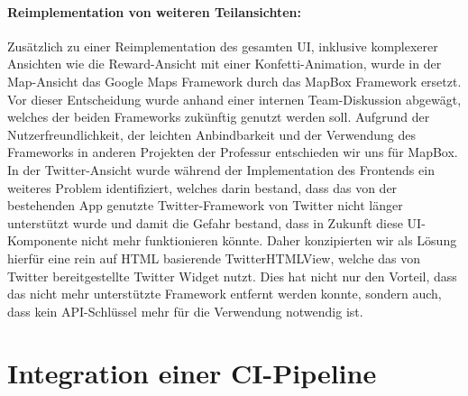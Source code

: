 \paragraph{Reimplementation von weiteren Teilansichten: } Zusätzlich zu einer Reimplementation des gesamten UI, inklusive komplexerer Ansichten wie die Reward-Ansicht mit einer Konfetti-Animation, wurde in der Map-Ansicht das Google Maps Framework durch das MapBox Framework ersetzt. Vor dieser Entscheidung wurde anhand einer internen Team-Diskussion abgewägt, welches der beiden Frameworks zukünftig genutzt werden soll. Aufgrund der Nutzerfreundlichkeit, der leichten Anbindbarkeit und der Verwendung des Frameworks in anderen Projekten der Professur entschieden wir uns für MapBox. In der Twitter-Ansicht wurde während der Implementation des Frontends ein weiteres Problem identifiziert, welches darin bestand, dass das von der bestehenden App genutzte Twitter-Framework von Twitter nicht länger unterstützt wurde und damit die Gefahr bestand, dass in Zukunft diese UI-Komponente nicht mehr funktionieren könnte. Daher konzipierten wir als Lösung hierfür eine rein auf HTML basierende TwitterHTMLView, welche das von Twitter bereitgestellte Twitter Widget nutzt. Dies hat nicht nur den Vorteil, dass das nicht mehr unterstützte Framework entfernt werden konnte, sondern auch, dass kein API-Schlüssel mehr für die Verwendung notwendig ist.

\section{Integration einer CI-Pipeline}

